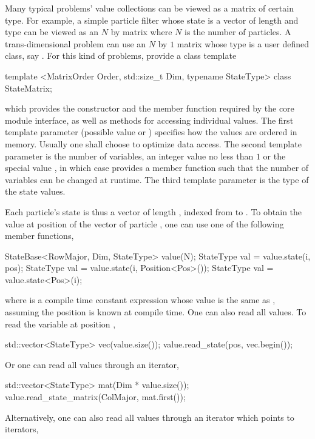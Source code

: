 Many typical problems' value collections can be viewed as a matrix of certain
type. For example, a simple particle filter whose state is a vector of length
 and type  can be viewed as an $N$ by
 matrix where $N$ is the number of particles. A
trans-dimensional problem can use an $N$ by $1$ matrix whose type is a user
defined class, say . For this kind of problems, \vsmc
provide a class template
\begin{cppcode}
template <MatrixOrder Order, std::size_t Dim, typename StateType>
class StateMatrix;
\end{cppcode}
which provides the constructor and the  member function
required by the core module interface, as well as methods for accessing
individual values. The first template parameter (possible value
 or ) specifies how the values are
ordered in memory. Usually one shall choose  to optimize
data access. The second template parameter is the number of variables, an
integer value no less than $1$ or the special value , in
which case  provides a member function
 such that the number of variables can be changed at
runtime. The third template parameter is the type of the state values.

Each particle's state is thus a vector of length , indexed from
 to . To obtain the value at position
 of the vector of particle , one can use one of
the following member functions,
\begin{cppcode}
StateBase<RowMajor, Dim, StateType> value(N);
StateType val = value.state(i, pos);
StateType val = value.state(i, Position<Pos>());
StateType val = value.state<Pos>(i);
\end{cppcode}
where  is a compile time constant expression whose value is the
same as , assuming the position is known at compile time. One
can also read all values. To read the variable at position ,
\begin{cppcode}
std::vector<StateType> vec(value.size());
value.read_state(pos, vec.begin());
\end{cppcode}
Or one can read all values through an iterator,
\begin{cppcode}
std::vector<StateType> mat(Dim * value.size());
value.read_state_matrix(ColMajor, mat.first());
\end{cppcode}
Alternatively, one can also read all values through an iterator which points
to iterators,

